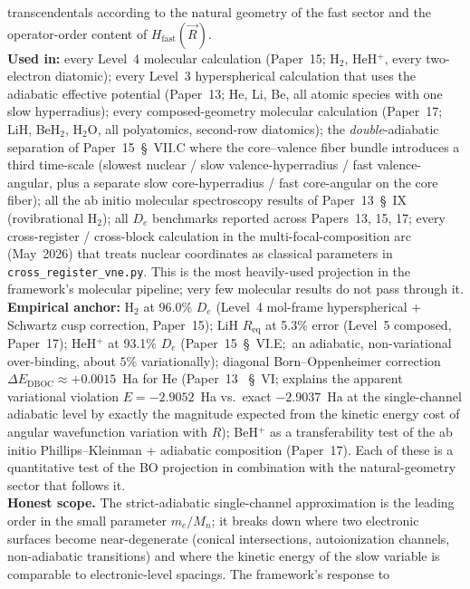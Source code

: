 \documentclass[11pt]{article}
\begin{document}
transcendentals according to the natural geometry of the fast sector
and the operator-order content of $H_\text{fast}(\vec{R})$.\\
\textbf{Used in:} every Level~4 molecular calculation (Paper~15;
H$_2$, HeH$^+$, every two-electron diatomic); every Level~3
hyperspherical calculation that uses the adiabatic effective potential
(Paper~13; He, Li, Be, all atomic species with one slow
hyperradius); every composed-geometry molecular calculation
(Paper~17; LiH, BeH$_2$, H$_2$O, all polyatomics, second-row
diatomics); the \emph{double}-adiabatic separation of Paper~15~\S~VII.C
where the core--valence fiber bundle introduces a third time-scale
(slowest nuclear / slow valence-hyperradius / fast valence-angular,
plus a separate slow core-hyperradius / fast core-angular on the
core fiber); all the ab initio molecular spectroscopy results of
Paper~13~\S~IX (rovibrational H$_2$); all $D_e$ benchmarks reported
across Papers~13, 15, 17; every cross-register / cross-block
calculation in the multi-focal-composition arc (May~2026) that
treats nuclear coordinates as classical parameters in
\texttt{cross\_register\_vne.py}.  This is the most heavily-used
projection in the framework's molecular pipeline; very few molecular
results do not pass through it.\\
\textbf{Empirical anchor:} H$_2$ at 96.0\% $D_e$ (Level~4
mol-frame hyperspherical + Schwartz cusp correction, Paper~15);
LiH $R_\text{eq}$ at 5.3\% error (Level~5 composed, Paper~17);
HeH$^+$ at 93.1\% $D_e$ (Paper~15~\S~VI.E;\ an adiabatic, non-variational over-binding, about $5\%$ variationally); diagonal Born--Oppenheimer
correction $\Delta E_\text{DBOC} \approx +0.0015$~Ha for He (Paper~13
~\S~VI; explains the apparent variational violation $E = -2.9052$~Ha
vs.\ exact $-2.9037$~Ha at the single-channel adiabatic level by
exactly the magnitude expected from the kinetic energy cost of
angular wavefunction variation with $R$); BeH$^+$ as a transferability
test of the ab initio Phillips--Kleinman + adiabatic composition
(Paper~17).  Each of these is a quantitative test of the BO projection
in combination with the natural-geometry sector that follows it.\\
\textbf{Honest scope.}  The strict-adiabatic single-channel
approximation is the leading order in the small parameter $m_e / M_n$;
it breaks down where two electronic surfaces become near-degenerate
(conical intersections, autoionization channels, non-adiabatic
transitions) and where the kinetic energy of the slow variable is
comparable to electronic-level spacings.  The framework's response to
\end{document}
